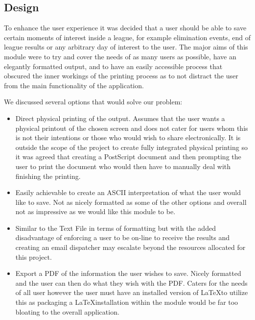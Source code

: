 \subsection{Design}

To enhance the user experience it was decided that a user should be
able to save certain moments of interest inside a league, for example
elimination events, end of league results or any arbitrary day of
interest to the user. The major aims of this module were to try and
cover the needs of as many users as possible, have an elegantly
formatted output, and to have an easily accessible process that
obscured the inner workings of the printing process as to not distract
the user from the main functionality of the application.

We discussed several options that would solve our problem:

\begin{itemize}
  \item[Physical Printing] Direct physical printing of the
    output. Assumes that the user wants a physical printout of the
    chosen screen and does not cater for users whom this is not their
    intentions or those who would wish to share electronically. It is
    outside the scope of the project to create fully integrated
    physical printing so it was agreed that creating a PostScript
    document and then prompting the user to print the document who
    would then have to manually deal with finishing the printing.
  \item[Text File] Easily achievable to create an ASCII interpretation
    of what the user would like to save. Not as nicely formatted as
    some of the other options and overall not as impressive as we
    would like this module to be.
  \item[Emailed results] Similar to the Text File in terms of
    formatting but with the added disadvantage of enforcing a user to
    be on-line to receive the results and creating an email dispatcher
    may escalate beyond the resources allocated for this project.
  \item[\LaTeX] Export a PDF of the information the user wishes to
    save. Nicely formatted and the user can then do what they wish
    with the PDF. Caters for the needs of all user however the user
    must have an installed version of \LaTeX to utilize this as
    packaging a \LaTeX installation within the module would be far too
    bloating to the overall application.
\end{itemize}


